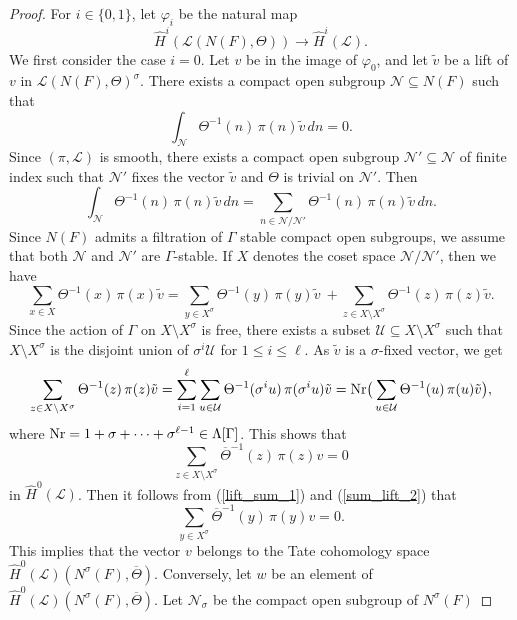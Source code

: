 \documentclass[10pt, reqno]{amsart}
\theoremstyle{plain}
\numberwithin{equation}{section} \newcommand{\di}{\operatorname{dim}}
\begin{document}
\begin{proof}
For $i\in\{0,1\}$, let $\varphi_i$ be the natural map
$$ \widehat{H}^i(\mathcal{L}(N(F),
\Theta))\longrightarrow \widehat{H}^i(\mathcal{L}). $$ We first
consider the case $i=0$. Let $v$ be in the image of $\varphi_0$, and
let $\tilde{v}$ be a lift of $v$ in $\mathcal{L}(N(F),\Theta)^\sigma$.
There exists a compact open subgroup $\mathcal{N}\subseteq N(F)$ such
that
\begin{equation}\label{lift_sum_1}
\int_{\mathcal{N}}\Theta^{-1}(n)\,\pi(n)\tilde{v}\,dn = 0.
\end{equation}
Since $(\pi,\mathcal{L})$ is smooth, there exists a compact open
subgroup $\mathcal{N}'\subseteq \mathcal{N}$ of finite index such that
$\mathcal{N'}$ fixes the vector $\tilde{v}$ and $\Theta$ is trivial on
$\mathcal{N}'$. Then
$$ \int_{\mathcal{N}}\Theta^{-1}(n)\,
\pi(n)\tilde{v}\,dn = \sum_{n\in \mathcal{N}/\mathcal{N}'}
\Theta^{-1}(n)\,\pi(n)\tilde{v}\,dn. $$ Since $N(F)$ admits a
filtration of $\Gamma$ stable compact open subgroups, we
assume that both $\mathcal{N}$ and $\mathcal{N}'$ are $\Gamma$-stable. If $X$
denotes the coset space $\mathcal{N} /\mathcal{N}'$, then we have
\begin{equation}\label{sum_lift_2}
\sum_{x\in X} \Theta^{-1}(x)\,\pi(x)\tilde{v} =
\sum_{y\in X^\sigma} \Theta^{-1}(y)\,\pi(y)\tilde{v}\ +
\sum_{z\in {X\setminus X^\sigma}} \Theta^{-1}(z)\,\pi(z)\tilde{v}.
\end{equation}
Since the action of $\Gamma$ on $X\setminus X^\sigma$ is
free, there exists a subset $\mathcal{U}\subseteq X\setminus X^\sigma$
such that $X\setminus X^\sigma$ is the disjoint union of
$\sigma^i\mathcal{U}$ for $1\leq i\leq\ell$. As $\tilde{v}$ is a
$\sigma$-fixed vector, we get
$$ \sum_{z\in {X\setminus X^\sigma}} \Theta^{-1}(z)\,\pi(z)\tilde{v} =
\sum_{i=1}^\ell\sum_{u\in \mathcal{U}}\Theta^{-1}(\sigma^iu)\,
\pi(\sigma^iu)\tilde{v} = {\rm Nr}\big(\sum_{u\in \mathcal{U}}
\Theta^{-1}(u)\,\pi(u)\tilde{v}\big), $$ where
${\rm Nr} = 1+\sigma+\cdots +\sigma^{\ell-1}\in \Lambda[\Gamma]$. This
shows that
$$ \sum_{z\in {X\setminus X^\sigma}} 
\overline{\Theta}^{-1}(z)\,\pi(z)v = 0 $$ 
in $\widehat{H}^0(\mathcal{L})$. Then it follows from
(\ref{lift_sum_1}) and (\ref{sum_lift_2}) that
$$ \sum_{y\in X^\sigma} 
\overline{\Theta}^{-1}(y)\,\pi(y)v = 0. $$ This implies that the vector $v$
belongs to the Tate cohomology space
$\widehat{H}^0(\mathcal{L})(N^\sigma(F),\overline{\Theta})$.
Conversely, let $w$ be an element of
$\widehat{H}^0(\mathcal{L})(N^\sigma(F),\overline{\Theta})$.  Let
$\mathcal{N}_{\sigma}$ be the compact open subgroup of $N^\sigma(F)$

\end{proof}
\end{document}
